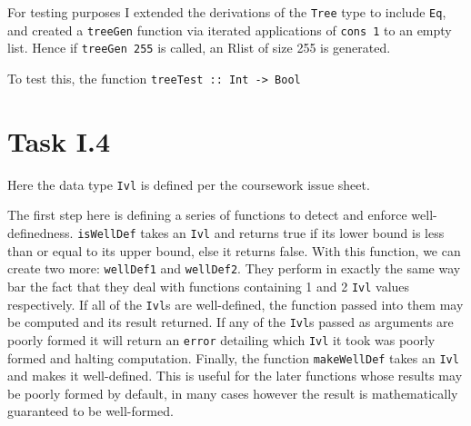 \documentclass[11pt]{article}
\begin{document}
For testing purposes I extended the derivations of the \verb|Tree| type to include \verb|Eq|, and created a \verb|treeGen| function via iterated applications of \verb|cons 1| to an empty list.
Hence if \verb|treeGen 255| is called, an Rlist of size 255 is generated.



To test this, the function \verb|treeTest :: Int -> Bool|

\section{Task I.4}



Here the data type \verb|Ivl| is defined per the coursework issue sheet.



The first step here is defining a series of functions to detect and enforce well-definedness.
\verb|isWellDef| takes an \verb|Ivl| and returns true if its lower bound is less than or equal to its upper bound, else it returns false.
With this function, we can create two more: \verb|wellDef1| and \verb|wellDef2|.
They perform in exactly the same way bar the fact that they deal with functions containing 1 and 2 \verb|Ivl| values respectively.
If all of the \verb|Ivl|s are well-defined, the function passed into them may be computed and its result returned.
If any of the \verb|Ivl|s passed as arguments are poorly formed it will return an \verb|error| detailing which \verb|Ivl| it took was poorly formed and halting computation.
Finally, the function \verb|makeWellDef| takes an \verb|Ivl| and makes it well-defined.
This is useful for the later functions whose results may be poorly formed by default, in many cases however the result is mathematically guaranteed to be well-formed.

\end{document}
